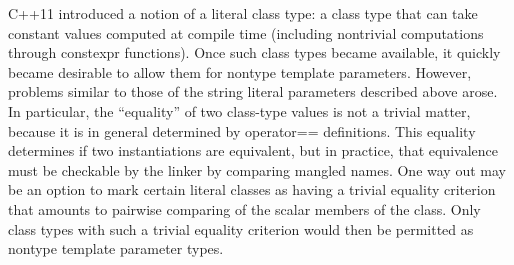 C++11 introduced a notion of a literal class type: a class type that can take constant values computed at compile time (including nontrivial computations through constexpr functions). Once such class types became available, it quickly became desirable to allow them for nontype template parameters. However, problems similar to those of the string literal parameters described above arose. In particular, the “equality” of two class-type values is not a trivial matter, because it is in general determined by operator== definitions. This equality determines if two instantiations are equivalent, but in practice, that equivalence must be checkable by the linker by comparing mangled names. One way out may be an option to mark certain literal classes as having a trivial equality criterion that amounts to pairwise comparing of the scalar members of the class. Only class types with such a trivial equality criterion would then be permitted as nontype template parameter types.




































